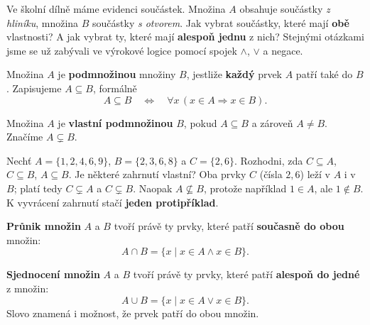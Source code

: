 \documentclass[11pt,a4paper]{article}
\begin{document}
Ve školní dílně máme evidenci součástek. Množina $A$ obsahuje součástky
\emph{z hliníku}, množina $B$ součástky \emph{s otvorem}. Jak vybrat součástky,
které mají \textbf{obě} vlastnosti? A jak vybrat ty, které mají
\textbf{alespoň jednu} z nich? Stejnými otázkami jsme se už zabývali
ve výrokové logice pomocí spojek $\land$, $\lor$ a negace.


\begin{definiceBox}[title={Definice - Podmnožina}]
Množina $A$ je \textbf{podmnožinou} množiny $B$, jestliže
\textbf{každý} prvek $A$ patří také do $B$.
Zapisujeme $A\subseteq B$, formálně
\[
A\subseteq B\quad\Longleftrightarrow\quad
\forall x\,(x\in A\Rightarrow x\in B).
\]
\end{definiceBox}
\begin{definiceBox}[title={Definice - Vlastní podmnožina}]
Množina $A$ je \textbf{vlastní podmnožinou} $B$, pokud
$A\subseteq B$ a zároveň $A\ne B$. Značíme $A\subsetneq B$.
\end{definiceBox}

\begin{prikladReseniBox}[title={Příklad 1}]
Nechť $A=\{1,2,4,6,9\}$, $B=\{2,3,6,8\}$ a $C=\{2,6\}$.
Rozhodni, zda $C\subseteq A$, $C\subseteq B$, $A\subseteq B$.
Je některé zahrnutí vlastní?
\tcblower
Oba prvky $C$ (čísla $2,6$) leží v $A$ i v $B$;
platí tedy $C\subsetneq A$ a $C\subsetneq B$.
Naopak $A\nsubseteq B$, protože například $1\in A$, ale $1\notin B$.
K vyvrácení zahrnutí stačí \textbf{jeden protipříklad}.
\end{prikladReseniBox}


\begin{definiceBox}[title={Definice - Průnik množin}]
\textbf{Průnik množin} $A$ a $B$ tvoří právě ty prvky, které
patří \textbf{současně do obou} množin:
\[
A\cap B=\{x\mid x\in A\land x\in B\}.
\]
\end{definiceBox}
\begin{definiceBox}[title={Definice - Sjednocení množin}]
\textbf{Sjednocení množin} $A$ a $B$ tvoří právě ty prvky,
které patří \textbf{alespoň do jedné} z množin:
\[
A\cup B=\{x\mid x\in A\lor x\in B\}.
\]
Slovo  znamená i možnost, že prvek patří do obou množin.
\end{definiceBox}
\end{document}
